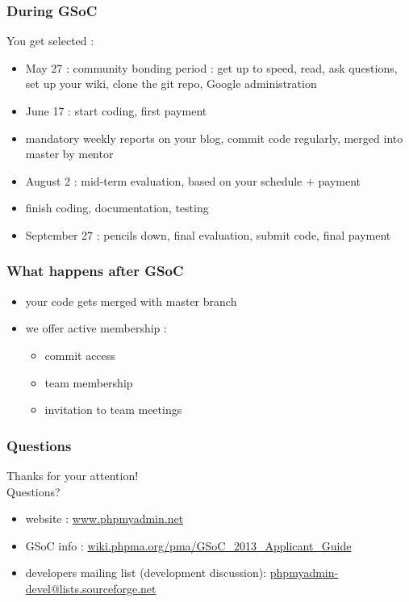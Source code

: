 \documentclass[14pt]{beamer}
\begin{document}
  \begin{frame}
    \frametitle{During GSoC}
    You get selected :
    \begin{itemize}
      \item May 27 : community bonding period : get up to speed, read, ask questions, set up your wiki, clone the git repo, Google administration
      \pause
      \item June 17 : start coding, first payment
      \item mandatory weekly reports on your blog, commit code regularly, merged into master by mentor
      \pause
      \item August 2 : mid-term evaluation, based on your schedule + payment
      \pause
      \item finish coding, documentation, testing
      \pause
      \item September 27 : pencils down, final evaluation, submit code, final payment
    \end{itemize}
  \end{frame}
  \begin{frame}
    \frametitle{What happens after GSoC}
    \begin{itemize}
      \item your code gets merged with master branch
      \item we offer active membership :
      \begin{itemize}
        \item commit access
        \item team membership
        \item invitation to team meetings
      \end{itemize}
    \end{itemize}
  \end{frame}
  \begin{frame}
   \frametitle{Questions}
    Thanks for your attention!\\
    Questions?
    \begin{itemize}
      \item website : \href{http://www.phpmyadmin.net/}{www.phpmyadmin.net}
      \item GSoC info : \href{http://wiki.phpma.org/pma/GSoC\_2013\_Applicant\_Guide}{wiki.phpma.org/pma/GSoC\_2013\_Applicant\_Guide}
      \item developers mailing list (development discussion): \href{mailto:phpmyadmin-devel@lists.sourceforge.net}{phpmyadmin-devel@lists.sourceforge.net}
    \end{itemize}
  \end{frame}
\end{document}
